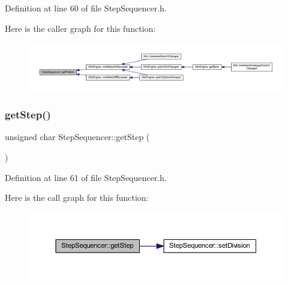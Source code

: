 Definition at line 60 of file Step\+Sequencer.\+h.

Here is the caller graph for this function\+:
\nopagebreak
\begin{figure}[H]
\begin{center}
\leavevmode
\includegraphics[width=350pt]{class_step_sequencer_a6c3987d5f4a966e8fcde3f7926aca54e_icgraph}
\end{center}
\end{figure}
\mbox{\label{class_step_sequencer_ad00472eb91462892049d5e4757e29af3}} 
\subsubsection{\texorpdfstring{get\+Step()}{getStep()}}
{\footnotesize\ttfamily unsigned char Step\+Sequencer\+::get\+Step (\begin{DoxyParamCaption}{ }\end{DoxyParamCaption})\hspace{0.3cm}{\ttfamily [inline]}}



Definition at line 61 of file Step\+Sequencer.\+h.

Here is the call graph for this function\+:
\nopagebreak
\begin{figure}[H]
\begin{center}
\leavevmode
\includegraphics[width=350pt]{class_step_sequencer_ad00472eb91462892049d5e4757e29af3_cgraph}
\end{center}
\end{figure}
\mbox{\label{class_step_sequencer_a706e6a91c6b3ccd606876f57c334b311}} 

